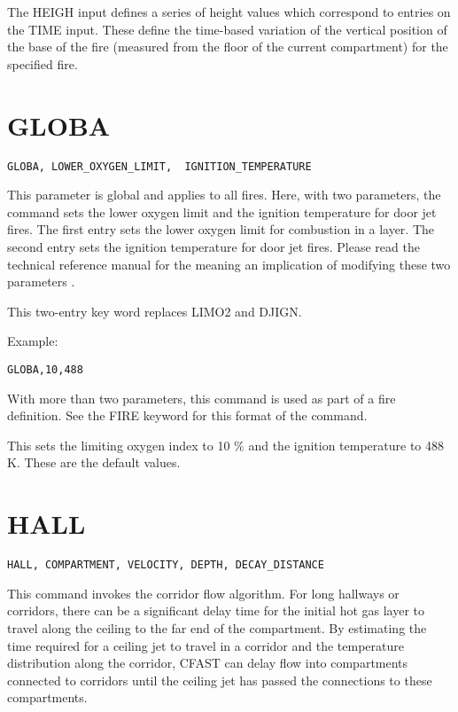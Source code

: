 The HEIGH input defines a series of height values which correspond to entries on the TIME input.  These define the time-based variation of the vertical position of the base of the fire (measured from the floor of the current compartment) for the specified fire.

\section{GLOBA}

\begin{lstlisting}
GLOBA, LOWER_OXYGEN_LIMIT,  IGNITION_TEMPERATURE
\end{lstlisting}

This parameter is global and applies to all fires. Here, with two parameters, the command sets the lower oxygen limit and the ignition temperature for door jet fires. The first entry sets the lower oxygen limit for combustion in a layer. The second entry sets the ignition temperature for door jet fires. Please read the technical reference manual for the meaning an implication of modifying these two parameters \cite{CFAST_Tech_Guide_6}.

This two-entry key word replaces LIMO2 and DJIGN.

Example:

\begin{lstlisting}
GLOBA,10,488
\end{lstlisting}

With more than two parameters, this command is used as part of a fire definition.  See the FIRE keyword for this format of the command.

This sets the limiting oxygen index to 10 \% and the ignition temperature to 488 K. These are the default values.

\section{HALL}

\begin{lstlisting}
HALL, COMPARTMENT, VELOCITY, DEPTH, DECAY_DISTANCE
\end{lstlisting}

This command invokes the corridor flow algorithm. For long hallways or corridors, there can be a significant delay time for the initial hot gas layer to travel along the ceiling to the far end of the compartment. By estimating the time required for a ceiling jet to travel in a corridor and the temperature distribution along the corridor, CFAST can delay flow into compartments connected to corridors until the ceiling jet has passed the connections to these compartments.

